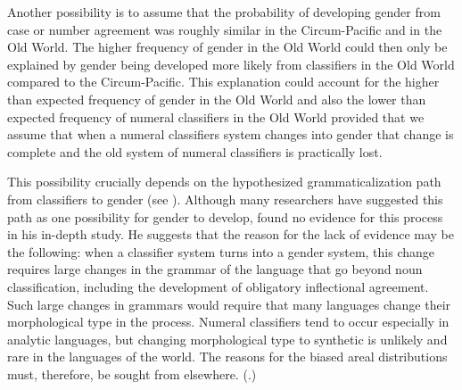 \documentclass[output=collectionpaper]{langsci/langscibook}
\begin{document}
Another possibility is to assume that the probability of developing gender from case or number agreement was roughly similar in the Circum-Pacific and in the Old World. The higher frequency of gender in the Old World could then only be explained by gender being developed more likely from classifiers in the Old World compared to the Circum-Pacific. This explanation could account for the higher than expected frequency of gender in the Old World and also the lower than expected frequency of numeral classifiers in the Old World \textendash{} provided that we assume that when a numeral classifiers system changes into gender that change is complete and the old system of numeral classifiers is practically lost.

This possibility crucially depends on the hypothesized grammaticalization path from classifiers to gender (see ). Although many researchers have suggested this path as one possibility for gender to develop, \citet[346]{Passer2016b} found no evidence for this process in his in-depth study. He suggests that the reason for the lack of evidence may be the following: when a classifier system turns into a gender system, this change requires large changes in the grammar of the language that go beyond noun classification, including the development of obligatory inflectional agreement. Such large changes in grammars would require that many languages change their morphological type in the process. Numeral classifiers tend to occur especially in analytic languages, but changing morphological type to synthetic is unlikely and rare in the languages of the world. The reasons for the biased areal distributions must, therefore, be sought from elsewhere. (\citealt{Passer2016b}.)
\end{document}
